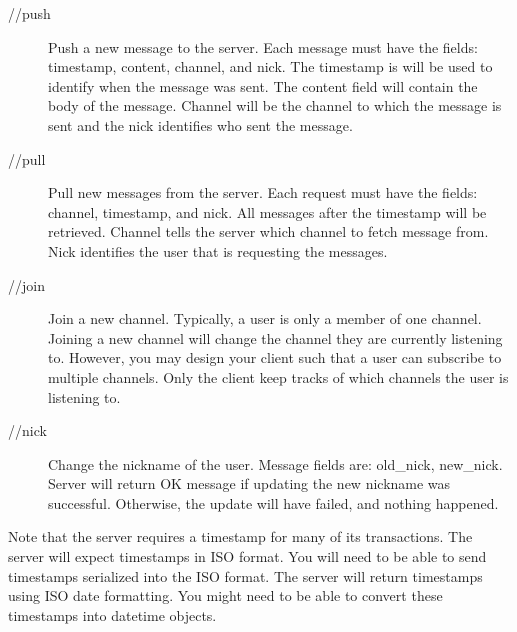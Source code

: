 \begin{problem}
\begin{description}
\item[//push] Push a new message to the server.
Each message must have the fields: timestamp, content, channel, and nick.
The timestamp is will be used to identify when the message was sent.
The content field will contain the body of the message.
Channel will be the channel to which the message is sent and the nick identifies who sent the message.
\item[//pull] Pull new messages from the server.
Each request must have the fields: channel, timestamp, and nick.
All messages after the timestamp will be retrieved.
Channel tells the server which channel to fetch message from.
Nick identifies the user that is requesting the messages.
\item[//join] Join a new channel.  Typically, a user is only a member of one channel.  Joining a new channel will change the channel they are currently listening to.  However, you may design your client such that a user can subscribe to multiple channels.
Only the client keep tracks of which channels the user is listening to.
\item[//nick] Change the nickname of the user.
Message fields are: old\_nick, new\_nick.
Server will return OK message if updating the new nickname was successful.
Otherwise, the update will have failed, and nothing happened.
\end{description}

Note that the server requires a timestamp for many of its transactions.
The server will expect timestamps in ISO format.  You will need to be able to send  timestamps serialized into the ISO format.  The server will return timestamps using ISO date formatting.  You might need to be able to convert these timestamps into datetime objects.

\label{prob:messageboard}
\end{problem}
